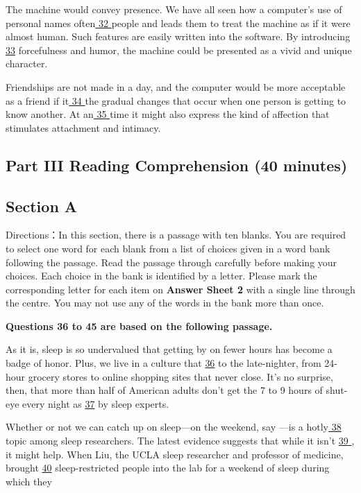\documentclass[UTF8,11pt]{ctexart}
\begin{document}
The machine would convey presence. We have all seen how a computer’s use of personal names often\uline{ 32 }people and leads them to treat the machine as if it were almost human. Such features are easily written into the software. By introducing \uline{33} forcefulness and humor, the machine could be presented as a vivid and unique character.


Friendships are not made in a day, and the computer would be more acceptable as a friend if it\uline{ 34 }the gradual changes that occur when one person is getting to know another. At an\uline{ 35 }time it might also express the kind of affection that stimulates attachment and intimacy.


\subsection*{\textbf{Part} III \textbf{Reading Comprehension} \textbf{(40 minutes)}}


\subsection*{\textbf{Section A}}


Directions：In this section, there is a passage with ten blanks. You are required to select one word for each blank from a list of choices given in a word bank following the passage. Read the passage through carefully before making your choices. Each choice in the bank is identified by a letter. Please mark the corresponding letter for each item on\textbf{ Answer Sheet 2} with a single line through the centre. You may not use any of the words in the bank more than once.


\textbf{Questions 36 to 45 are based on the following passage.}


As it is, sleep is so undervalued that getting by on fewer hours has become a badge of honor. Plus, we live in a culture that \uline{36} to the late-nighter, from 24-hour grocery stores to online shopping sites that never close. It’s no surprise, then, that more than half of American adults don’t get the 7 to 9 hours of shut-eye every night as \uline{37} by sleep experts.


Whether or not we can catch up on sleep—on the weekend, say —is a hotly\uline{ 38 }topic among sleep researchers. The latest evidence suggests that while it isn’t \uline{39 }, it might help. When Liu, the UCLA sleep researcher and professor of medicine, brought \uline{40} sleep-restricted people into the lab for a weekend of sleep during which they
\end{document}
